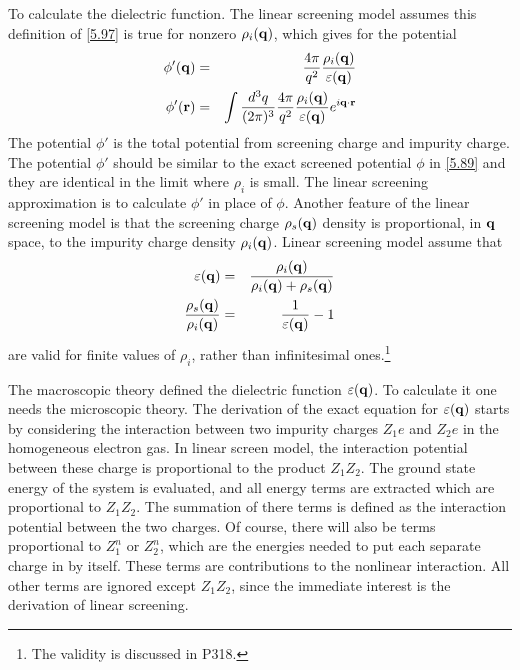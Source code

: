 To calculate the dielectric function.
The linear screening model assumes this definition of \eqref{5.97} is true for nonzero $\rho_i(\mathbf{q})$, which gives for the potential
\begin{eqnarray}
    \phi'(\mathbf{q}) &=& \frac{4\pi}{q^2} \frac{\rho_i(\mathbf{q})}{\varepsilon(\mathbf{q})} \label{5.98} \\
    \phi'(\mathbf{r}) &=& \int \frac{d^3 q}{(2\pi)^3} \frac{4\pi}{q^2} \frac{\rho_i(\mathbf{q})}{\varepsilon(\mathbf{q})} e^{i\mathbf{q}\cdot\mathbf{r}} \label{5.99}
\end{eqnarray}
The potential $\phi'$ is the total potential from screening charge and impurity charge.
The potential $\phi'$ should be similar to the exact screened potential $\phi$ in \eqref{5.89} and they are identical in the limit where $\rho_i$ is small.
The linear screening approximation is to calculate $\phi'$ in place of $\phi$.
Another feature of the linear screening model is that the screening charge $\rho_s(\mathbf{q})$ density is proportional, in $\mathbf{q}$ space, to the impurity charge density $\rho_i(\mathbf{q})$.
Linear screening model assume that
\begin{eqnarray}
    \varepsilon (\mathbf{q}) &=& \frac{\rho_i(\mathbf{q})}{\rho_i(\mathbf{q}) + \rho_s(\mathbf{q})} \label{5.100} \\
    \frac{\rho_s(\mathbf{q})}{\rho_i(\mathbf{q})} &=& \frac{1}{\varepsilon(\mathbf{q})} -1   \label{5.101}
\end{eqnarray}
are valid for finite values of $\rho_i$, rather than infinitesimal ones.\footnote{The validity is discussed in P318.}

The macroscopic theory defined the dielectric function $\varepsilon(\mathbf{q})$.
To calculate it one needs the microscopic theory.
The derivation of the exact equation for $\varepsilon(\mathbf{q})$ starts by considering the interaction between two impurity charges $Z_1e$ and $Z_2 e$ in the homogeneous electron gas.
In linear screen model, the interaction potential between these charge is proportional to the product $Z_1Z_2$.
The ground state energy of the system is evaluated, and all energy terms are extracted which are proportional to $Z_1Z_2$.
The summation of there terms is defined as the interaction potential between the two charges.
Of course, there will also be terms proportional to $Z_1^n$ or $Z_2^n$, which are the energies needed to put each separate charge in by itself.
These terms are contributions to the nonlinear interaction.
All other terms are ignored except $Z_1 Z_2$, since the immediate interest is the derivation of linear screening.

